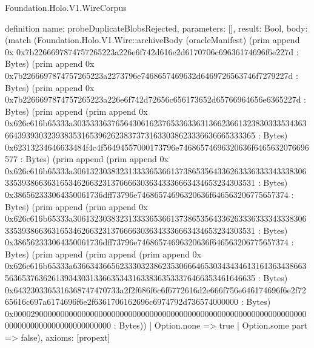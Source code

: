 \begin{lexlean}{Foundation.Holo.V1.WireCorpus}
\begin{semanticmodule}
definition{
  name: probeDuplicateBlobsRejected,
  parameters: [],
  result: Bool,
  body: (match (Foundation.Holo.V1.Wire::archiveBody (oracleManifest) (prim append 0x 0x7b2266697874757265223a226e6f742d616e2d6170706c69636174696f6e227d : Bytes) (prim append 0x 0x7b2266697874757265223a2273796e7468657469632d6469726563746f7279227d : Bytes) (prim append 0x 0x7b2266697874757265223a226e6f742d72656c656173652d65766964656e6365227d : Bytes) (prim append (prim append 0x 0x626c616b65333a303533363765643061623765336336313662366132383033353436366439393032393835316539626238373731633038623336636665333365 : Bytes) 0x62313234646633484f4c4f56494557000173796e74686574696320636f6465632076696577 : Bytes) (prim append (prim append 0x 0x626c616b65333a306132303832313333653661373865356433626333633334333830633539386636316534626632313766663036343336663434653234303531 : Bytes) 0x386562333064350061736dff73796e74686574696320636f646563206775657374 : Bytes) (prim append (prim append 0x 0x626c616b65333a306132303832313333653661373865356433626333633334333830633539386636316534626632313766663036343336663434653234303531 : Bytes) 0x386562333064350061736dff73796e74686574696320636f646563206775657374 : Bytes) (prim append (prim append (prim append 0x 0x626c616b65333a636634366562333032386235306664653034343461316136343866356365376362613934303133663534316338363533376466353461646635 : Bytes) 0x6432303365316368747470733a2f2f686f6c6f6772616d2e666f756e646174696f6e2f7265616c697a6174696f6e2f6361706162696c6974792d736574000000 : Bytes) 0x0000290000000000000000000000000000000000000000000000000000000000000000000000000000000000000000 : Bytes))
    | Option.none => true
    | Option.some part => false),
  axioms: [propext]
}


\end{semanticmodule}
\end{lexlean}
